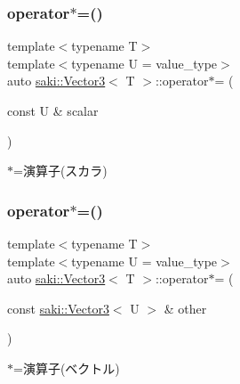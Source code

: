 \subsubsection{\texorpdfstring{operator$\ast$=()}{operator*=()}\hspace{0.1cm}{\footnotesize\ttfamily [1/2]}}
{\footnotesize\ttfamily template$<$typename T$>$ \\
template$<$typename U  = value\+\_\+type$>$ \\
auto \mbox{\hyperlink{classsaki_1_1_vector3}{saki\+::\+Vector3}}$<$ T $>$\+::operator$\ast$= (\begin{DoxyParamCaption}\item[{const U \&}]{scalar }\end{DoxyParamCaption})\hspace{0.3cm}{\ttfamily [inline]}}



$\ast$=演算子(スカラ) 

\mbox{\label{classsaki_1_1_vector3_a69ebc6f000a2d0d9b15007f371d1385b}} 
\subsubsection{\texorpdfstring{operator$\ast$=()}{operator*=()}\hspace{0.1cm}{\footnotesize\ttfamily [2/2]}}
{\footnotesize\ttfamily template$<$typename T$>$ \\
template$<$typename U  = value\+\_\+type$>$ \\
auto \mbox{\hyperlink{classsaki_1_1_vector3}{saki\+::\+Vector3}}$<$ T $>$\+::operator$\ast$= (\begin{DoxyParamCaption}\item[{const \mbox{\hyperlink{classsaki_1_1_vector3}{saki\+::\+Vector3}}$<$ U $>$ \&}]{other }\end{DoxyParamCaption})\hspace{0.3cm}{\ttfamily [inline]}}



$\ast$=演算子(ベクトル) 

\mbox{\label{classsaki_1_1_vector3_ac62c6c17a33ec907731ddf78cee93b0e}} 
